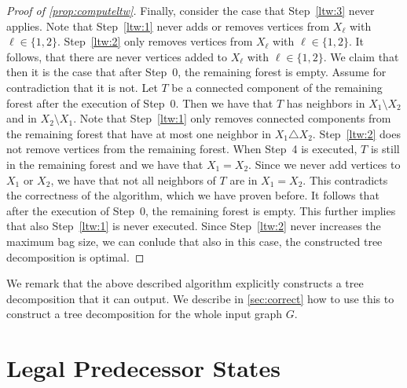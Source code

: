 \documentclass[a4paper,UKenglish,cleveref, autoref, thm-restate, numberwithinsect]{lipics-v2021}
\newcounter{algorithm}
\begin{document}
\begin{proof}[Proof of \cref{prop:computeltw}]
 Finally, consider the case that Step~\ref{ltw:3} never applies. Note that Step~\ref{ltw:1} never adds or removes vertices from $X_\ell$ with $\ell\in\{1,2\}$. Step~\ref{ltw:2} only removes vertices from $X_\ell$ with $\ell\in\{1,2\}$. It follows, that there are never vertices added to $X_\ell$ with $\ell\in\{1,2\}$. We claim that then it is the case that after Step~0, the remaining forest is empty. Assume for contradiction that it is not. Let $T$ be a connected component of the remaining forest after the execution of Step~0. Then we have that $T$ has neighbors in $X_1\setminus X_2$ and in $X_2\setminus X_1$. Note that Step~\ref{ltw:1} only removes connected components from the remaining forest that have at most one neighbor in $X_1\triangle X_2$. Step~\ref{ltw:2} does not remove vertices from the remaining forest. When Step~4 is executed, $T$ is still in the remaining forest and we have that $X_1=X_2$. Since we never add vertices to $X_1$ or $X_2$, we have that not all neighbors of $T$ are in $X_1=X_2$. This contradicts the correctness of the algorithm, which we have proven before. It follows that after the execution of Step~0, the remaining forest is empty. This further implies that also Step~\ref{ltw:1} is never executed. Since Step~\ref{ltw:2} never increases the maximum bag size, we can conlude that also in this case, the constructed tree decomposition is optimal.
\end{proof}

We remark that the above described algorithm explicitly constructs a tree decomposition that it can output. We describe in \cref{sec:correct} how to use this to construct a tree decomposition for the whole input graph $G$.

\section{Legal Predecessor States}\label{sec:legal}
\end{document}
